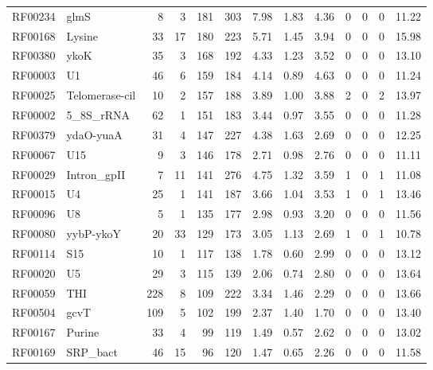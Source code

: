 \begin{table}
\begin{center}
\begin{tabular}{|ll|rr|rr|r|rr|rrrr|}
RF00234 & glmS            &     8 &     3 &   181 & 303 &   7.98 &   1.83 &   4.36 &   0 &  0 &  0 &  11.22 \\
RF00168 & Lysine          &    33 &    17 &   180 & 223 &   5.71 &   1.45 &   3.94 &   0 &  0 &  0 &  15.98 \\
RF00380 & ykoK            &    35 &     3 &   168 & 192 &   4.33 &   1.23 &   3.52 &   0 &  0 &  0 &  13.10 \\
RF00003 & U1              &    46 &     6 &   159 & 184 &   4.14 &   0.89 &   4.63 &   0 &  0 &  0 &  11.24 \\
RF00025 & Telomerase-cil  &    10 &     2 &   157 & 188 &   3.89 &   1.00 &   3.88 &   2 &  0 &  2 &  13.97 \\
RF00002 & 5\_8S\_rRNA     &    62 &     1 &   151 & 183 &   3.44 &   0.97 &   3.55 &   0 &  0 &  0 &  11.28 \\
RF00379 & ydaO-yuaA       &    31 &     4 &   147 & 227 &   4.38 &   1.63 &   2.69 &   0 &  0 &  0 &  12.25 \\
RF00067 & U15             &     9 &     3 &   146 & 178 &   2.71 &   0.98 &   2.76 &   0 &  0 &  0 &  11.11 \\
RF00029 & Intron\_gpII    &     7 &    11 &   141 & 276 &   4.75 &   1.32 &   3.59 &   1 &  0 &  1 &  11.08 \\
RF00015 & U4              &    25 &     1 &   141 & 187 &   3.66 &   1.04 &   3.53 &   1 &  0 &  1 &  13.46 \\
RF00096 & U8              &     5 &     1 &   135 & 177 &   2.98 &   0.93 &   3.20 &   0 &  0 &  0 &  11.56 \\
RF00080 & yybP-ykoY       &    20 &    33 &   129 & 173 &   3.05 &   1.13 &   2.69 &   1 &  0 &  1 &  10.78 \\
RF00114 & S15             &    10 &     1 &   117 & 138 &   1.78 &   0.60 &   2.99 &   0 &  0 &  0 &  13.12 \\
RF00020 & U5              &    29 &     3 &   115 & 139 &   2.06 &   0.74 &   2.80 &   0 &  0 &  0 &  13.64 \\
RF00059 & THI             &   228 &     8 &   109 & 222 &   3.34 &   1.46 &   2.29 &   0 &  0 &  0 &  13.66 \\
RF00504 & gcvT            &   109 &     5 &   102 & 199 &   2.37 &   1.40 &   1.70 &   0 &  0 &  0 &  13.40 \\
RF00167 & Purine          &    33 &     4 &    99 & 119 &   1.49 &   0.57 &   2.62 &   0 &  0 &  0 &  13.02 \\
RF00169 & SRP\_bact       &    46 &    15 &    96 & 120 &   1.47 &   0.65 &   2.26 &   0 &  0 &  0 &  11.58 \\

\end{tabular}
\end{center}
\end{table}
